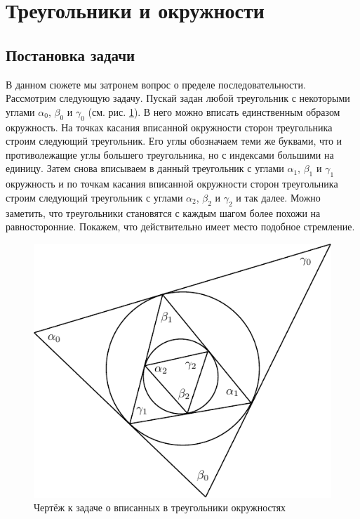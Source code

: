 \documentclass[a4paper,9pt,russian]{article}
\begin{document}
\section{Треугольники и окружности}
\subsection{Постановка задачи}
В данном сюжете мы затронем вопрос о пределе последовательности. Рассмотрим следующую задачу. Пускай задан любой треугольник с некоторыми углами $\alpha_0$, $\beta_0$ и $\gamma_0$ (см. рис. \ref{fig:6}). В него можно вписать единственным образом окружность. На точках касания вписанной окружности сторон треугольника строим следующий треугольник. Его углы обозначаем теми же буквами, что и противолежащие углы большего треугольника, но с индексами большими на единицу. Затем снова вписываем в данный треугольник с углами $\alpha_1$, $\beta_1$ и $\gamma_1$ окружность и по точкам касания вписанной окружности сторон треугольника строим следующий треугольник с углами $\alpha_2$, $\beta_2$ и $\gamma_2$ и так далее. Можно заметить, что треугольники становятся с каждым шагом более похожи на равносторонние. Покажем, что действительно имеет место подобное стремление.

\begin{figure}[h]
	\centering
	\includegraphics[scale = 1]{first5.pdf}
	\caption{Чертёж к задаче о вписанных в треугольники окружностях}
	\label{fig:6}
\end{figure}
\end{document}
